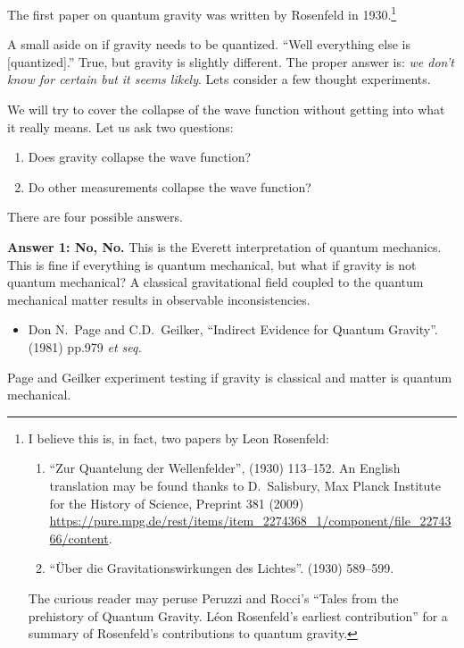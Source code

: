 \lecture

The first paper on quantum gravity was written by Rosenfeld in
1930.\footnote{I believe this is, in fact, two papers by Leon Rosenfeld:
\begin{enumerate}
\item ``Zur Quantelung der Wellenfelder'',
  (1930) 113--152. An English translation
may be found thanks to D.~Salisbury, Max Planck
Institute for the History of Science, Preprint 381 (2009) \url{https://pure.mpg.de/rest/items/item_2274368_1/component/file_2274366/content}.
\item ``\"{U}ber die Gravitationswirkungen des Lichtes''.   (1930) 589--599.
\end{enumerate}
The curious reader may peruse Peruzzi and Rocci's ``Tales from the prehistory of Quantum Gravity. L\'eon Rosenfeld's earliest contribution''  for a summary of
Rosenfeld's contributions to quantum gravity.}

A small aside on if gravity needs to be quantized. ``Well everything
else is [quantized].'' True, but gravity is slightly different. The
proper answer is: \emph{we don't know for certain but it seems
likely}. Lets consider a few thought experiments.

We will try to cover the collapse of the wave function without getting
into what it really means. Let us ask two questions:
\begin{enumerate}
\item Does gravity collapse the wave function?
\item Do other measurements collapse the wave function?
\end{enumerate}
There are four possible answers.

\bigbreak\noindent\textbf{Answer 1: No, No.}  This is the Everett
interpretation of quantum mechanics. This is fine if everything is
quantum mechanical, but what if gravity is not quantum mechanical? A
classical gravitational field coupled to the quantum mechanical matter
results in observable inconsistencies.

\begin{itemize}
\item Don N.~Page and C.D.~Geilker,
``Indirect Evidence for Quantum Gravity''.
  (1981) pp.979 \emph{et seq.}
{\tt{}}
\end{itemize}
Page and Geilker experiment testing if gravity is classical and matter
is quantum mechanical.

